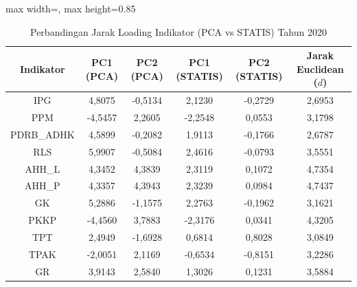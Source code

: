 \begin{table}[H]
\centering
\caption{Perbandingan Jarak Loading Indikator (PCA vs STATIS) Tahun 2020} \label{tab:app1jarak_loading_2020}
\begin{adjustbox}{max width=\textwidth, max height=0.85\textheight}
\begin{tabular}{|c|c|c|c|c|c|}
\hline
\textbf{Indikator} & \textbf{PC1 (PCA)} & \textbf{PC2 (PCA)} & \textbf{PC1 (STATIS)} & \textbf{PC2 (STATIS)} & \textbf{Jarak Euclidean ($d$)} \\
\hline
IPG & 4,8075 & -0,5134 & 2,1230 & -0,2729 & 2,6953 \\
PPM & -4,5457 & 2,2605 & -2,2548 & 0,0553 & 3,1798 \\
PDRB\_ADHK & 4,5899 & -0,2082 & 1,9113 & -0,1766 & 2,6787 \\
RLS & 5,9907 & -0,5084 & 2,4616 & -0,0793 & 3,5551 \\
AHH\_L & 4,3452 & 4,3839 & 2,3119 & 0,1072 & 4,7354 \\
AHH\_P & 4,3357 & 4,3943 & 2,3239 & 0,0984 & 4,7437 \\
GK & 5,2886 & -1,1575 & 2,2763 & -0,1962 & 3,1621 \\
PKKP & -4,4560 & 3,7883 & -2,3176 & 0,0341 & 4,3205 \\
TPT & 2,4949 & -1,6928 & 0,6814 & 0,8028 & 3,0849 \\
TPAK & -2,0051 & 2,1169 & -0,6534 & -0,8151 & 3,2286 \\
GR & 3,9143 & 2,5840 & 1,3026 & 0,1231 & 3,5884 \\
\hline
\end{tabular}
\end{adjustbox}
\end{table}